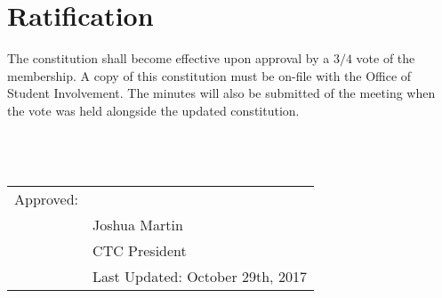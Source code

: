 \documentclass{article}
\newcommand{\datechanged}{Last Updated: October 29th, 2017}
\newcommand{\article}[1]{\section{#1} \label{#1}}
\begin{document}
\article{Ratification}
The constitution shall become effective upon approval by a $3/4$ vote of the membership. A copy of this constitution must be on-file with the Office of Student Involvement. The minutes will also be submitted of the meeting when the vote was held alongside the updated constitution.\\ \\ \\ \\

\begin{tabular}{@{}p{.5in}p{4in}@{}}
Approved: & \hrulefill \\
& Joshua Martin \\
& CTC President\\
& \datechanged
\end{tabular}
\end{document}
